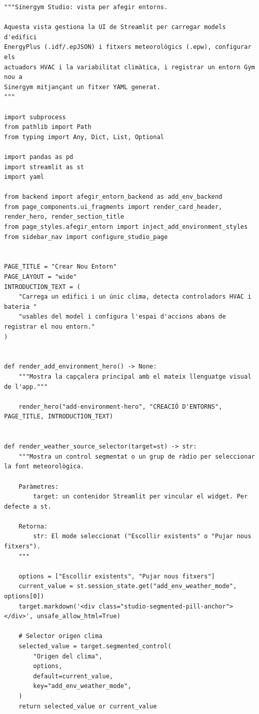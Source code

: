 \documentclass[10pt,a4paper]{article}
\begin{document}
\begin{lstlisting}[style=studioPython,caption={pages/Afegir\_Entorn.py},label={lst:pages-afegir-entorn-py}]
"""Sinergym Studio: vista per afegir entorns.

Aquesta vista gestiona la UI de Streamlit per carregar models d'edifici
EnergyPlus (.idf/.epJSON) i fitxers meteorològics (.epw), configurar els
actuadors HVAC i la variabilitat climàtica, i registrar un entorn Gym nou a
Sinergym mitjançant un fitxer YAML generat.
"""

import subprocess
from pathlib import Path
from typing import Any, Dict, List, Optional

import pandas as pd
import streamlit as st
import yaml

from backend import afegir_entorn_backend as add_env_backend
from page_components.ui_fragments import render_card_header, render_hero, render_section_title
from page_styles.afegir_entorn import inject_add_environment_styles
from sidebar_nav import configure_studio_page


PAGE_TITLE = "Crear Nou Entorn"
PAGE_LAYOUT = "wide"
INTRODUCTION_TEXT = (
    "Carrega un edifici i un únic clima, detecta controladors HVAC i bateria "
    "usables del model i configura l'espai d'accions abans de registrar el nou entorn."
)


def render_add_environment_hero() -> None:
    """Mostra la capçalera principal amb el mateix llenguatge visual de l'app."""

    render_hero("add-environment-hero", "CREACIÓ D'ENTORNS", PAGE_TITLE, INTRODUCTION_TEXT)


def render_weather_source_selector(target=st) -> str:
    """Mostra un control segmentat o un grup de ràdio per seleccionar la font meteorològica.

    Paràmetres:
        target: un contenidor Streamlit per vincular el widget. Per defecte a st.

    Retorna:
        str: El mode seleccionat ("Escollir existents" o "Pujar nous fitxers").
    """

    options = ["Escollir existents", "Pujar nous fitxers"]
    current_value = st.session_state.get("add_env_weather_mode", options[0])
    target.markdown('<div class="studio-segmented-pill-anchor"></div>', unsafe_allow_html=True)

    # Selector origen clima
    selected_value = target.segmented_control(
        "Origen del clima",
        options,
        default=current_value,
        key="add_env_weather_mode",
    )
    return selected_value or current_value



\end{lstlisting}
\end{document}
